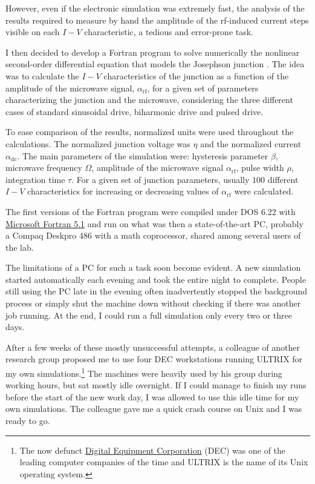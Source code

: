 However, even if the electronic simulation was extremely fast, the analysis of the results required to measure by hand the amplitude of the rf-induced current steps visible on each $I-V$ characteristic, a tedious and error-prone task.

I then decided to develop a Fortran program to solve numerically the nonlinear second-order differential equation that models the Josephson junction \cite{McCumber:1968, Stewart:1974}. 
The idea was to calculate the $I-V$ characteristics of the junction as a function of the amplitude of the microwave signal, $\alpha_\mathrm{rf}$, for a given set of parameters characterizing the junction and the microwave, considering the three different cases of standard sinusoidal drive, biharmonic drive and pulsed drive.

To ease comparison of the results, normalized units were used throughout the calculations. The normalized junction voltage was $\eta$ and the normalized current $\alpha_\mathrm{dc}$.
The main parameters of the simulation were: hysteresis parameter $\beta$, microwave frequency $\Omega$, amplitude of the microwave signal $\alpha_\mathrm{rf}$, pulse width $\rho$, integration time $\tau$. 
For a given set of junction parameters, usually $100$ different $I-V$ characteristics for increasing or decreasing values of $\alpha_\mathrm{rf}$ were calculated.

The first versions of the Fortran program were compiled under DOS 6.22 with \href{https://winworldpc.com/product/microsoft-fortran/5x}{Microsoft Fortran 5.1} and run on what was then a state-of-the-art PC, probably a Compaq Deskpro 486 with a math coprocessor, shared among several users of the lab.

The limitations of a PC for such a task soon become evident.
A new simulation started automatically each evening and took the entire night to complete. People still using the PC late in the evening often inadvertently stopped the background process or simply shut the machine down without checking if there was another job running. 
At the end, I could run a full simulation only every two or three days.

After a few weeks of these mostly unsuccessful attempts, a colleague of another research group proposed me to use four DEC workstations running ULTRIX for my own simulations.\footnote{The now defunct \href{https://en.wikipedia.org/wiki/Digital_Equipment_Corporation}{Digital Equipment Corporation} (DEC) was one of the leading computer companies of the time and ULTRIX is the name of its Unix operating system.}
The machines were heavily used by his group during working hours, but sat mostly idle overnight. 
If I could manage to finish my runs before the start of the new work day, I was allowed to use this idle time for my own simulations.
The colleague gave me a quick crash course on Unix and I was ready to go.

